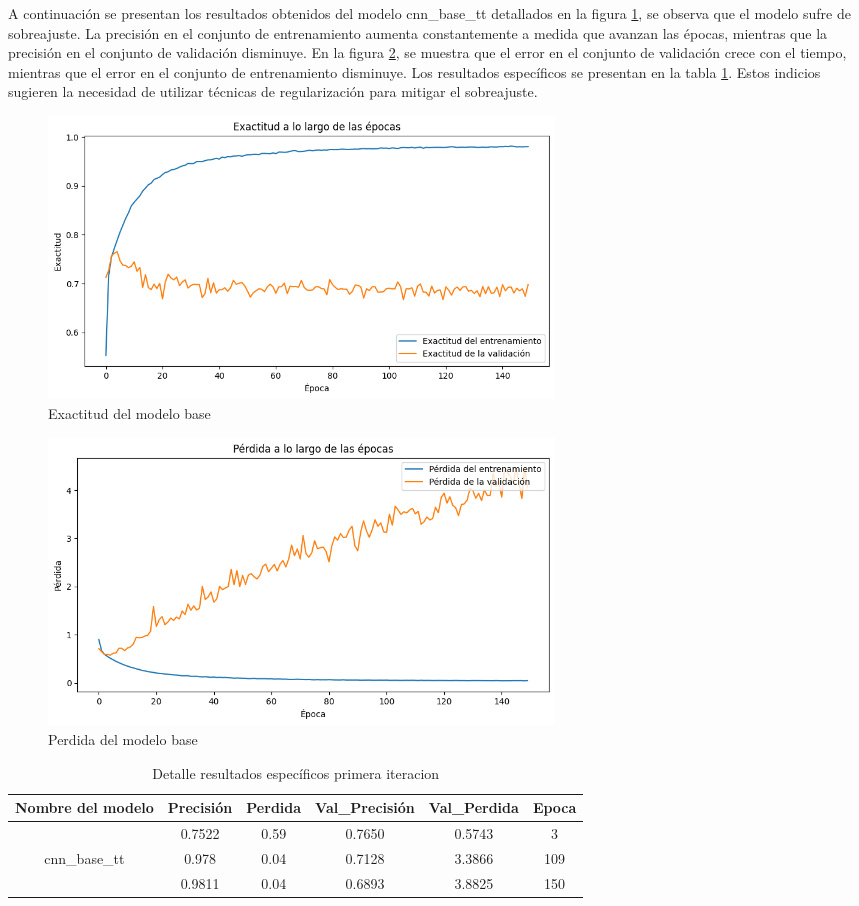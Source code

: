 A continuación se presentan los resultados obtenidos del modelo cnn\_base\_tt detallados en la figura \ref{fig:exactitud}, se observa que el modelo sufre de sobreajuste. La precisión en el conjunto de entrenamiento aumenta constantemente a medida que avanzan las épocas, mientras que la precisión en el conjunto de validación disminuye. En la figura \ref{fig:perdida}, se muestra que el error en el conjunto de validación crece con el tiempo, mientras que el error en el conjunto de entrenamiento disminuye. Los resultados específicos se presentan en la tabla \ref{tbl:6}. Estos indicios sugieren la necesidad de utilizar técnicas de regularización para mitigar el sobreajuste.

\begin{figure}
	\includegraphics[width=0.65\textwidth]{capitulo5/figuras/exactitud.png}
	\caption{Exactitud del modelo base}
	\label{fig:exactitud}
\end{figure}

\begin{figure}
	\includegraphics[width=0.65\textwidth]{capitulo5/figuras/perdida.png}
	\caption{Perdida del modelo base}
	\label{fig:perdida}
\end{figure}

\begin{table}[!ht]
	\centering
	\begin{tabular}{|c|c|c|c|c|c|}
		\hline
		\textbf{Nombre del modelo} & \textbf{Precisión} & \textbf{Perdida} & \textbf{Val\_Precisión} & \textbf{Val\_Perdida} & \textbf{Epoca} \\ \hline
		~ & 0.7522 & 0.59 & 0.7650 & 0.5743 & 3 \\ \cline{2-6} 
		cnn\_base\_tt & 0.978 & 0.04 & 0.7128 & 3.3866 & 109 \\ \cline{2-6} 
		~ & 0.9811 & 0.04 & 0.6893 & 3.8825 & 150 \\ \hline
	\end{tabular}
	\caption{Detalle resultados específicos primera iteracion}
	\label{tbl:6}
\end{table}

